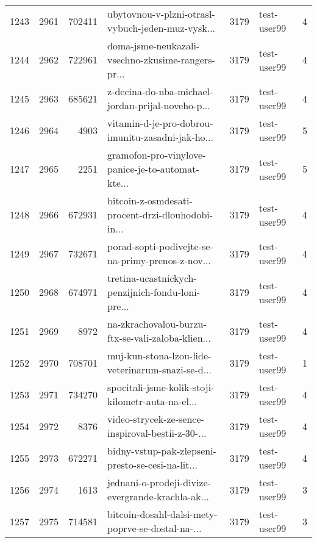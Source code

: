 \begin{tabular}{lrrlrlr}
1243 &       2961 &   702411 &  ubytovnou-v-plzni-otrasl-vybuch-jeden-muz-vysk... &     3179 &                  test-user99 &               4 \\
1244 &       2962 &   722961 &  doma-jsme-neukazali-vsechno-zkusime-rangers-pr... &     3179 &                  test-user99 &               4 \\
1245 &       2963 &   685621 &  z-decina-do-nba-michael-jordan-prijal-noveho-p... &     3179 &                  test-user99 &               4 \\
1246 &       2964 &     4903 &  vitamin-d-je-pro-dobrou-imunitu-zasadni-jak-ho... &     3179 &                  test-user99 &               5 \\
1247 &       2965 &     2251 &  gramofon-pro-vinylove-panice-je-to-automat-kte... &     3179 &                  test-user99 &               5 \\
1248 &       2966 &   672931 &  bitcoin-z-osmdesati-procent-drzi-dlouhodobi-in... &     3179 &                  test-user99 &               4 \\
1249 &       2967 &   732671 &  porad-sopti-podivejte-se-na-primy-prenos-z-nov... &     3179 &                  test-user99 &               4 \\
1250 &       2968 &   674971 &  tretina-ucastnickych-penzijnich-fondu-loni-pre... &     3179 &                  test-user99 &               4 \\
1251 &       2969 &     8972 &  na-zkrachovalou-burzu-ftx-se-vali-zaloba-klien... &     3179 &                  test-user99 &               4 \\
1252 &       2970 &   708701 &  muj-kun-stona-lzou-lide-veterinarum-snazi-se-d... &     3179 &                  test-user99 &               1 \\
1253 &       2971 &   734270 &  spocitali-jsme-kolik-stoji-kilometr-auta-na-el... &     3179 &                  test-user99 &               4 \\
1254 &       2972 &     8376 &  video-strycek-ze-sence-inspiroval-bestii-z-30-... &     3179 &                  test-user99 &               4 \\
1255 &       2973 &   672271 &  bidny-vstup-pak-zlepseni-presto-se-cesi-na-lit... &     3179 &                  test-user99 &               4 \\
1256 &       2974 &     1613 &  jednani-o-prodeji-divize-evergrande-krachla-ak... &     3179 &                  test-user99 &               3 \\
1257 &       2975 &   714581 &  bitcoin-dosahl-dalsi-mety-poprve-se-dostal-na-... &     3179 &                  test-user99 &               3 \\

\end{tabular}
